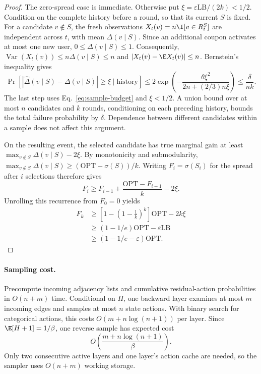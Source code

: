 \begin{proof}
The zero-spread case is immediate. Otherwise put
$\xi=\varepsilon\mathrm{LB}/(2k)<1/2$.
Condition on the complete history before a round, so that its current
$S$ is fixed. For a candidate $v\notin S$, the fresh observations
$X_t(v)=n\I[v\in R_t^S]$ are independent across $t$, with mean
$\Delta(v\mid S)$. Since an additional coupon activates at most one
new user, $0\leq\Delta(v\mid S)\leq1$. Consequently,
$\operatorname{Var}(X_t(v))\leq n\Delta(v\mid S)\leq n$ and
$|X_t(v)-\E X_t(v)|\leq n$. Bernstein's inequality gives
\[
  \Pr\!\left[|\widehat\Delta(v\mid S)-\Delta(v\mid S)|\geq\xi
      \mid\text{history}\right]
  \leq2\exp\!\left(-\frac{\theta\xi^2}{2n+(2/3)n\xi}\right)
  \leq\frac{\delta}{nk}.
\]
The last step uses Eq.~\eqref{eq:sample-budget} and $\xi<1/2$.
A union bound over at most $n$ candidates and $k$ rounds, conditioning
on each preceding history, bounds the total failure probability by
$\delta$. Dependence between different candidates within a sample
does not affect this argument.

On the resulting event, the selected candidate has true marginal gain
at least $\max_{v\notin S}\Delta(v\mid S)-2\xi$.
By monotonicity and submodularity,
$\max_{v\notin S}\Delta(v\mid S)\geq
(\mathrm{OPT}-\sigma(S))/k$. Writing $F_i=\sigma(S_i)$ for the
spread after $i$ selections therefore gives
\[
  F_i\geq F_{i-1}+\frac{\mathrm{OPT}-F_{i-1}}k-2\xi.
\]
Unrolling this recurrence from $F_0=0$ yields
\begin{align*}
  F_k&\geq\left[1-\left(1-\frac1k\right)^k\right]\mathrm{OPT}-2k\xi\\
     &\geq(1-1/e)\mathrm{OPT}-\varepsilon\mathrm{LB}\\
     &\geq(1-1/e-\varepsilon)\mathrm{OPT}.
\end{align*}
\end{proof}

\paragraph{Sampling cost.}
Precompute incoming adjacency lists and cumulative residual-action
probabilities in $O(n+m)$ time. Conditional on $H$, one backward
layer examines at most $m$ incoming edges and samples at most $n$
state actions. With binary search for categorical actions, this costs
$O(m+n\log(n+1))$ per layer. Since $\E[H+1]=1/\beta$, one reverse
sample has expected cost
\[
  O\!\left(\frac{m+n\log(n+1)}\beta\right).
\]
Only two consecutive active layers and one layer's action cache are
needed, so the sampler uses $O(n+m)$ working storage.

